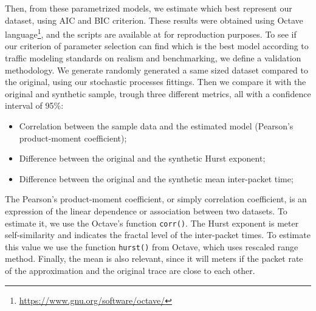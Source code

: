 Then, from these parametrized models, we estimate which best represent our dataset, using AIC  and BIC criterion. These results were obtained using Octave language\footnote{ \href{https://www.gnu.org/software/octave/}{https://www.gnu.org/software/octave/}}, and the scripts are available at \cite{projeto-github} for reproduction purposes. To see if our criterion of parameter selection can find which is the best model according to traffic modeling standards on realism and benchmarking\cite{validate-trafficgen}, we define a validation methodology. We generate randomly generated a same sized dataset compared to the original, using our stochastic processes fittings.  Then we compare it with the original and synthetic sample, trough three different metrics, all with a confidence interval of 95\%:

\begin{itemize}
\item Correlation between the sample data and the estimated model (Pearson's product-moment coefficient);
\item Difference between the original and the synthetic Hurst exponent;
\item Difference between the original and the synthetic mean inter-packet time;
\end{itemize}

The Pearson's product-moment coefficient, or simply correlation coefficient,  is an expression of the linear dependence or association between two datasets. To estimate it, we use the Octave's function \texttt{corr()}. The Hurst exponent is meter self-similarity and indicates the fractal level of the inter-packet times.  To estimate this value we use the function \texttt{hurst()} from Octave, which uses rescaled range method. Finally, the mean is also relevant, since it will meters if the packet rate of the approximation and the original trace are close to each other. 

